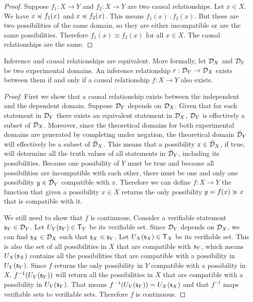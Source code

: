 \documentclass[11pt,letterpaper,fleqn]{memoir} %
\begin{document}
\begin{mathSection}
\begin{coro}
	\end{coro}\label{prop_causal_relationship_unique}
	\begin{proof}
		Suppose $f_1 : X \to Y$ and $f_2 : X \to Y$ are two causal relationships. Let $x \in X$. We have $x \preccurlyeq f_1(x)$ and $x \preccurlyeq f_2(x)$. This means $f_1(x) \comp f_2(x)$. But these are two possibilities of the same domain, so they are either incompatible or are the same possibilities. Therefore $f_1(x) \equiv f_2(x)$ for all $x \in X$. The causal relationships are the same.
	\end{proof}
	\begin{thrm}\label{2_thrm_experimental_relationship}
		Inference and causal relationships are equivalent. More formally, let $\mathcal{D}_X$ and $\mathcal{D}_Y$ be two experimental domains. An inference relationship $r: \mathcal{D}_Y \to \mathcal{D}_X$ exists between them if and only if a causal relationship $f: X \to Y$ also exists.
	\end{thrm}
	\begin{proof}
		First we show that a causal relationship exists between the independent and the dependent domain. Suppose $\mathcal{D}_Y$ depends on $\mathcal{D}_X$. Given that for each statement in $\mathcal{D}_Y$ there exists an equivalent statement in $\mathcal{D}_X$, $\mathcal{D}_Y$ is effectively a subset of $\mathcal{D}_X$. Moreover, since the theoretical domains for both experimental domains are generated by completing under negation, the theoretical domain $\bar{\mathcal{D}}_Y$ will effectively be a subset of $\bar{\mathcal{D}}_X$. This means that a possibility $x \in \bar{\mathcal{D}}_X$, if true, will determine all the truth values of  all statements in $\bar{\mathcal{D}}_Y$, including its possibilities. Because one possibility of $Y$ must be true and because all possibilities are incompatible with each other, there must be one and only one possibility $y \in \bar{\mathcal{D}}_Y$ compatible with $x$. Therefore we can define $f : X \to Y$ the function that given a possibility $x \in X$ returns the only possibility $y=f(x) \succcurlyeq x$ that is compatible with it.
		
		We still need to show that $f$ is continuous. Consider a verifiable statement $\mathsf{s}_Y \in \mathcal{D}_Y$. Let $U_Y(\mathsf{s}_Y) \in \mathsf{T}_Y$ be its verifiable set. Since $\mathcal{D}_Y$ depends on $\mathcal{D}_X$, we can find $\mathsf{s}_X \in \mathcal{D}_X$ such that $\mathsf{s}_X \equiv \mathsf{s}_Y$. Let $U_X(\mathsf{s}_X) \in \mathsf{T}_X$ be its verifiable set. This is also the set of all possibilities in $X$ that are compatible with $\mathsf{s}_Y$, which means $U_X(\mathsf{s}_X)$ contains all the possibilities that are compatible with a possibility in $U_Y(\mathsf{s}_Y)$. Since $f$ returns the only possibility in $Y$ compatible with a possibility in $X$, $f^{-1}(U_Y(\mathsf{s}_Y))$ will return all the possibilities in $X$ that are compatible with a possibility in $U_Y(\mathsf{s}_Y)$. That means $f^{-1}(U_Y(\mathsf{s}_Y)) = U_X(\mathsf{s}_X)$ and that $f^{-1}$ maps verifiable sets to verifiable sets. Therefore $f$ is continuous.
		

\end{proof}
\end{mathSection}
\end{document}
